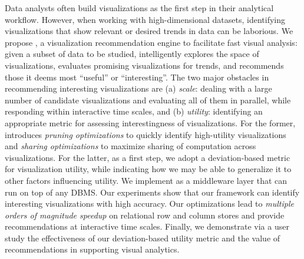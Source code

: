 Data analysts often build visualizations
as the first step in their analytical workflow.
However, when working with high-dimensional datasets, identifying visualizations
that show relevant or desired trends in data can be laborious.
We propose \SeeDB, a visualization recommendation engine to facilitate fast 
visual analysis: 
given a subset of data to be studied, \SeeDB intelligently explores the 
space of visualizations, evaluates promising visualizations for trends, and 
recommends those it 
deems most ``useful'' or ``interesting''. %
The two major obstacles in recommending interesting visualizations are (a) {\em scale}:
dealing with a large number of candidate visualizations and evaluating all of them in parallel, while
responding within interactive time scales, and (b) {\em utility}: identifying 
an appropriate metric for assessing interestingness of visualizations.
For the former, \SeeDB introduces {\em pruning optimizations} to quickly 
identify high-utility visualizations and {\em sharing optimizations} to maximize
sharing of computation across visualizations.
For the latter, as a first step, %
we adopt a 
deviation-based metric for visualization 
utility, while indicating how we may be able to generalize it to other factors
influencing utility.
We implement \SeeDB as a middleware layer that can run on top of any DBMS. 
Our experiments show that our framework can identify interesting visualizations with high accuracy. 
Our optimizations lead to 
{\em multiple orders of magnitude speedup} on relational row and column stores and provide
recommendations at interactive time scales.
Finally, we demonstrate via a user study the effectiveness of our deviation-based utility metric
and the value of recommendations in supporting visual analytics. 
